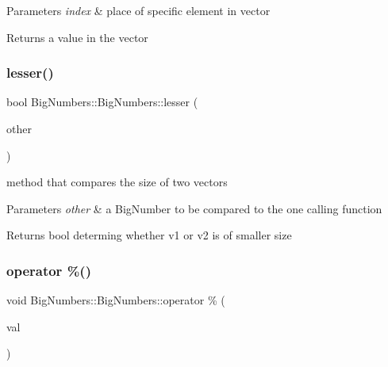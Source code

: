 \begin{DoxyParams}{Parameters}
{\em index} & place of specific element in vector \\
\hline
\end{DoxyParams}
\begin{DoxyReturn}{Returns}
a value in the vector 
\end{DoxyReturn}
\mbox{\label{class_big_numbers_1_1_big_numbers_a7dbbde79334a8a7a4fc9c502c20fa567}} 
\subsubsection{\texorpdfstring{lesser()}{lesser()}}
{\footnotesize\ttfamily bool Big\+Numbers\+::\+Big\+Numbers\+::lesser (\begin{DoxyParamCaption}\item[{\mbox{\hyperlink{class_big_numbers_1_1_big_numbers}{Big\+Numbers}}}]{other }\end{DoxyParamCaption})}



method that compares the size of two vectors 


\begin{DoxyParams}{Parameters}
{\em other} & a Big\+Number to be compared to the one calling function \\
\hline
\end{DoxyParams}
\begin{DoxyReturn}{Returns}
bool determing whether v1 or v2 is of smaller size 
\end{DoxyReturn}
\mbox{\label{class_big_numbers_1_1_big_numbers_ac5833fce77ce6d97d336b60a3577d9ae}} 
\subsubsection{\texorpdfstring{operator \%()}{operator \%()}}
{\footnotesize\ttfamily void Big\+Numbers\+::\+Big\+Numbers\+::operator \% (\begin{DoxyParamCaption}\item[{\mbox{\hyperlink{class_big_numbers_1_1_big_numbers}{Big\+Numbers}} \&}]{val }\end{DoxyParamCaption})}



